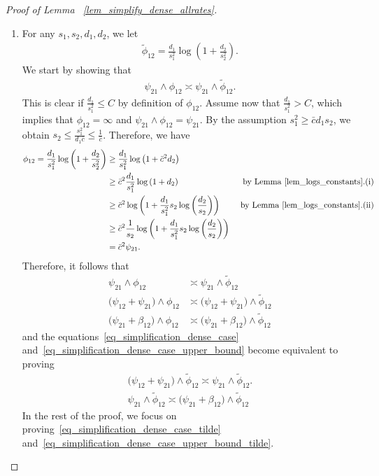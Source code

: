 \documentclass{article}
\theoremstyle{remark}
\begin{document}
\begin{proof}[Proof of Lemma ~\ref{lem_simplify_dense_allrates}]
\phantom{}

\begin{enumerate}
    \item 
For any $s_1,s_2, d_1, d_2$, we let 
\begin{align*}
    \widetilde \phi_{12} = \frac{d_1}{s_1^2} \log\left(1+\frac{d_2}{s_2^2}\right).
\end{align*}
We start by showing that 
\begin{align*}
    \psi_{21} \land \phi_{12} \asymp \psi_{21} \land \widetilde \phi_{12}.
\end{align*}
This is clear if $\frac{d_1}{s_1^2} \leq C$ by definition of $\phi_{12}$.  
Assume now that $\frac{d_1}{s_1^2} > C$, which implies that $\phi_{12} = \infty$ and $\psi_{21} \land \phi_{12} = \psi_{21}$. 
By the assumption $s_1^2 \geq \bar c d_1 s_2$, we obtain $s_2 \leq \frac{s_1^2}{d_1\bar c} \leq \frac{1}{\bar c}$. 
Therefore, we have
\begin{align*}
    \phi_{12} = \frac{d_1}{s_1^2} \log\left(1+\frac{d_2}{s_2^2}\right) &\geq \frac{d_1}{s_1^2} \log\left(1+\bar c^2 d_2\right)& \\
    &\geq \bar c^2\frac{d_1}{s_1^2} \log\left(1+d_2\right) &\text{ by Lemma~\ref{lem_logs_constants}.(i)}\\
    & \geq \bar c^2\log\left(1+\frac{d_1}{s_1^2} s_2\log\left(\frac{d_2}{s_2}\right)\right)  & \text{ by Lemma~\ref{lem_logs_constants}.(ii)}\\
    & \geq \bar c^2\frac{1}{s_2}\log\left(1+\frac{d_1}{s_1^2} s_2\log\left(\frac{d_2}{s_2}\right)\right) &\\
    & = \bar c^2 \psi_{21}.&
\end{align*}
Therefore, it follows that
\begin{align*}
    \psi_{21} \land \phi_{12} &\asymp \psi_{21} \land \widetilde \phi_{12}\\
    \Big(\psi_{12} + \psi_{21}\Big) \land \phi_{12} &\asymp\Big(\psi_{12} + \psi_{21}\Big) \land \widetilde \phi_{12}\\
    \Big(\psi_{21} + \beta_{12}\Big) \land \phi_{12} & \asymp \Big(\psi_{21} + \beta_{12}\Big) \land \widetilde \phi_{12} 
\end{align*}
and the equations~\eqref{eq_simplification_dense_case} and~\eqref{eq_simplification_dense_case_upper_bound} become equivalent to proving
\begin{align}
\Big(\psi_{12} + \psi_{21}\Big) \land \widetilde \phi_{12}
        \asymp \psi_{21} \land \widetilde \phi_{12}.\label{eq_simplification_dense_case_tilde}\\
\psi_{21} \land \widetilde \phi_{12}
        \asymp \Big(\psi_{21} + \beta_{12}\Big) \land \widetilde \phi_{12}\label{eq_simplification_dense_case_upper_bound_tilde}
\end{align}
In the rest of the proof, we focus on proving~\eqref{eq_simplification_dense_case_tilde} and~\eqref{eq_simplification_dense_case_upper_bound_tilde}.
    

\end{enumerate}
\end{proof}
\end{document}
